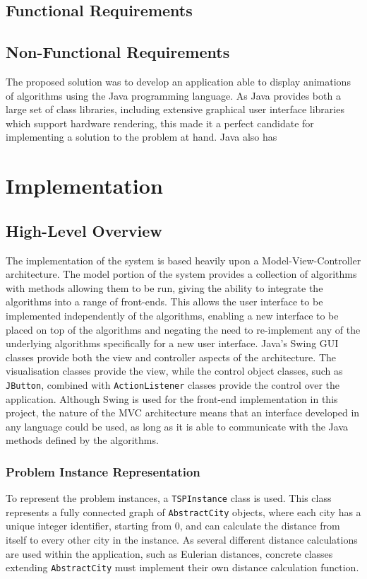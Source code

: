 \documentclass{l4proj}
\begin{document}
\section{Functional Requirements}

\section{Non-Functional Requirements}
The proposed solution was to develop an application able to display animations of algorithms using the Java programming 
language. As Java provides both a large set of class libraries, including extensive graphical user interface libraries which 
support hardware rendering, this made it a perfect candidate for implementing a solution to the problem at hand. Java also has 


\chapter{Implementation}
\label{implementation}

\section{High-Level Overview}
The implementation of the system is based heavily upon a Model-View-Controller architecture. The model portion of the system provides 
a collection of algorithms with methods allowing them to be run, giving the ability to integrate the algorithms into a range of front-ends. 
This allows the user interface to be implemented independently of the algorithms, enabling a new interface to be placed on top of the algorithms 
and negating the need to re-implement any of the underlying algorithms specifically for a new user interface. Java's Swing GUI classes 
provide both the view and controller aspects of the architecture. The visualisation classes provide the view, while the control object classes, 
such as \texttt{JButton}, combined with \texttt{ActionListener} classes provide the control over the application. Although Swing is used for 
the front-end implementation in this project, the nature of the MVC architecture means that an interface developed in any language could be 
used, as long as it is able to communicate with the Java methods defined by the algorithms.

\subsection{Problem Instance Representation}
To represent the problem instances, a \texttt{TSPInstance} class is used. This class represents a fully connected graph 
of \texttt{AbstractCity} objects, where each city has a unique integer identifier, starting from 0, and can calculate the 
distance from itself to every other city in the instance. As several different distance calculations are used within the 
application, such as Eulerian distances, concrete classes extending \texttt{AbstractCity} must implement their own distance calculation function.
\end{document}
